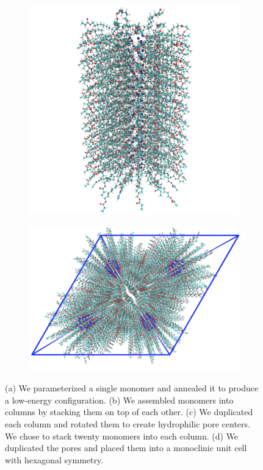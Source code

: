 \documentclass[journal=jpcbfk,manuscript=article]{achemso}
\begin{document}
\begin{figure}[!htb]
\begin{subfigure}[t]{0.42\textwidth}
  \caption{}
  \end{subfigure}
  \begin{subfigure}[t]{0.35\textwidth}
  \includegraphics[width=\linewidth]{initial_pore.pdf}
  \caption{}
  \end{subfigure}
  \begin{subfigure}[t]{0.45\textwidth}
  \includegraphics[width=\linewidth]{initial_unit_cell.pdf}
  \caption{}
  \end{subfigure}
  \caption{(a) We parameterized a single monomer and annealed it to produce a low-energy
		configuration. (b) We assembled monomers into columns by stacking them on top of each 
		other. (c) We duplicated each column and rotated them to create hydrophilic pore centers.
		We chose to stack twenty monomers into each column. (d) We duplicated the pores and 
		placed them into a monoclinic unit cell with hexagonal symmetry.}\label{fig:build_procedure}
  \end{figure}
  
\end{document}
